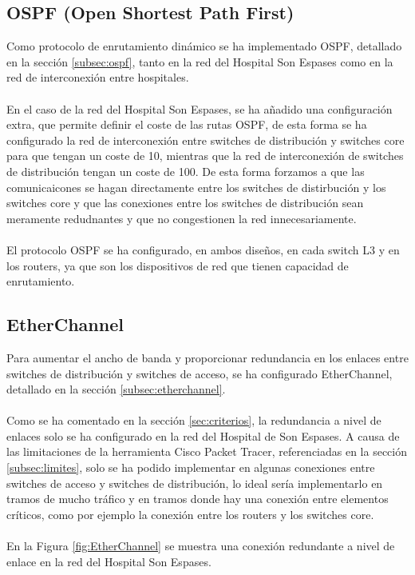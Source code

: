 \subsection{OSPF (Open Shortest Path First)}
Como protocolo de enrutamiento dinámico se ha implementado OSPF, detallado en la sección \ref{subsec:ospf}, 
tanto en la red del Hospital Son Espases como en la red de interconexión entre hospitales. 
\\ \\
En el caso de la red del Hospital Son Espases, se ha añadido una configuración extra, que permite definir el coste de las rutas OSPF, de esta forma se ha configurado la red de 
interconexión entre switches de distribución y switches core para que tengan un coste de 10, mientras que la red de interconexión de switches de distribución tengan un coste de 100. De
 esta forma forzamos a que las comunicaicones se hagan directamente entre los switches de distirbución y los switches core y que las conexiones entre los switches de distribución sean meramente redudnantes y que no 
congestionen la red innecesariamente.
\\ \\
El protocolo OSPF se ha configurado, en ambos diseños, en cada switch L3 y en los routers, ya que son los dispositivos de red que tienen capacidad de enrutamiento.

\subsection{EtherChannel}
Para aumentar el ancho de banda y proporcionar redundancia en los enlaces entre switches de distribución y switches de acceso, se ha configurado EtherChannel, detallado en la sección \ref{subsec:etherchannel}.
\\ \\
Como se ha comentado en la sección \ref{sec:criterios}, la redundancia a nivel de enlaces solo se ha configurado en la red del Hospital de Son Espases. A causa de las limitaciones de la herramienta Cisco Packet Tracer, referenciadas en la sección \ref{subsec:limites},
solo se ha podido implementar en algunas conexiones entre switches de acceso y switches de distribución, lo ideal sería implementarlo en tramos de mucho tráfico y en tramos donde hay una conexión entre elementos críticos, como por ejemplo la conexión entre los routers y los switches core.
\\ \\
En la Figura \ref{fig:EtherChannel} se muestra una conexión redundante a nivel de enlace en la red del Hospital Son Espases.

